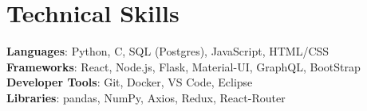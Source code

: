 \documentclass[letterpaper,11pt]{article}
\begin{document}
%
\section{Technical Skills}
 \begin{itemize}[leftmargin=0.15in, label={}]
    \small{\item{
     \textbf{Languages}{: Python, C, SQL (Postgres), JavaScript, HTML/CSS} \\
     \textbf{Frameworks}{: React, Node.js, Flask, Material-UI, GraphQL, BootStrap} \\
     \textbf{Developer Tools}{: Git, Docker, VS Code, Eclipse} \\
     \textbf{Libraries}{: pandas, NumPy, Axios, Redux, React-Router}
    }}
 \end{itemize}


\end{document}
